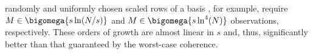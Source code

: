 %
randomly and uniformly chosen scaled rows of
a  basis
\cite[Thm. 3.3]{article:RudelsonCPAM2008}, for example, require
$M \in \bigomega{ s \ln( N / s ) }$ and
$M \in \bigomega{ s \ln^{4}( N ) }$ observations,
respectively.
These orders of
growth are
almost linear in $s$ and, thus, significantly better than
that guaranteed by
the worst-case coherence.

